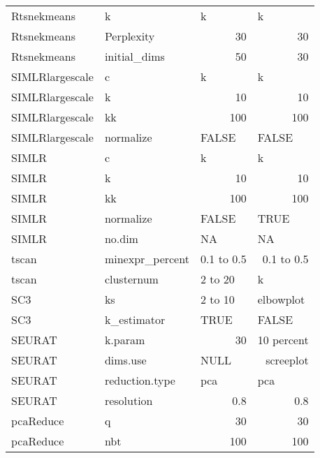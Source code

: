 \documentclass[12pt, a4paper]{article}\usepackage[]{graphicx}\usepackage[]{color}
\begin{document}
\begin{table}[htbp]
\begin{tabular}{llrr}
Rtsnekmeans & k     & \multicolumn{1}{l}{k} & \multicolumn{1}{l}{k} \\
Rtsnekmeans & Perplexity & 30    & 30 \\
Rtsnekmeans & initial\_dims & 50    & 30 \\
SIMLRlargescale & c     & \multicolumn{1}{l}{k} & \multicolumn{1}{l}{k} \\
SIMLRlargescale & k     & 10    & 10 \\
SIMLRlargescale & kk    & 100   & 100 \\
SIMLRlargescale & normalize & \multicolumn{1}{l}{FALSE} & \multicolumn{1}{l}{FALSE} \\
SIMLR & c     & \multicolumn{1}{l}{k} & \multicolumn{1}{l}{k} \\
SIMLR & k     & 10    & 10 \\
SIMLR & kk    & 100   & 100 \\
SIMLR & normalize & \multicolumn{1}{l}{FALSE} & \multicolumn{1}{l}{TRUE} \\
SIMLR & no.dim & \multicolumn{1}{l}{NA} & \multicolumn{1}{l}{NA} \\
tscan & minexpr\_percent & \multicolumn{1}{p{7.25em}}{0.1 to 0.5} & \multicolumn{1}{p{10.835em}}{0.1 to 0.5} \\
tscan & clusternum & \multicolumn{1}{l}{2 to 20} & \multicolumn{1}{l}{k} \\
SC3   & ks    & \multicolumn{1}{l}{2 to 10} & \multicolumn{1}{l}{elbowplot} \\
SC3   & k\_estimator & \multicolumn{1}{l}{TRUE} & \multicolumn{1}{l}{FALSE} \\
SEURAT & k.param & 30    & \multicolumn{1}{l}{10 percent} \\
SEURAT & dims.use & \multicolumn{1}{l}{NULL} & \multicolumn{1}{p{10.835em}}{screeplot} \\
SEURAT & reduction.type & \multicolumn{1}{l}{pca} & \multicolumn{1}{l}{pca} \\
SEURAT & resolution  & 0.8   & 0.8 \\
pcaReduce & q     & 30    & 30 \\
pcaReduce & nbt   & 100   & 100 \\
\end{tabular}%
\label{tab:addlabel}%
\end{table}%
\end{document}
